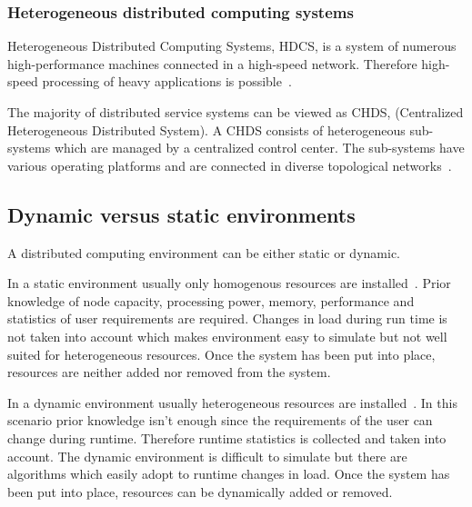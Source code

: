 \documentclass{cslthse-msc}
\begin{document}
\subsubsection{Heterogeneous distributed computing systems}
Heterogeneous Distributed Computing Systems, HDCS, is a system of numerous high-performance machines connected in a high-speed network. Therefore high-speed processing of heavy applications is possible~\cite{algoMinExTime}. %

The majority of distributed service systems can be viewed as CHDS, (Centralized Heterogeneous Distributed System). A CHDS consists of heterogeneous sub-systems which are managed by a centralized control center. The sub-systems have various operating platforms and are connected in diverse topological networks~\cite{studyServiceRel}.


\subsection{Dynamic versus static environments} \label{subsec:background_dyn_stat_env}
A distributed computing environment can be either static or dynamic.

In a static environment usually only homogenous resources are installed~\cite{compStudyLoadAndCloud}. Prior knowledge of node capacity, processing power, memory, performance and statistics of user requirements are required. Changes in load during run time is not taken into account which makes environment easy to simulate but not well suited for heterogeneous resources. Once the system has been put into place, resources are neither added nor removed from the system.

In a dynamic environment usually heterogeneous resources are installed~\cite{compStudyLoadAndCloud}. In this scenario prior knowledge isn't enough since the requirements of the user can change during runtime. Therefore runtime statistics is collected and taken into account. The dynamic environment is difficult to simulate but there are algorithms which easily adopt to runtime changes in load. Once the system has been put into place, resources can be dynamically added or removed.
\end{document}
